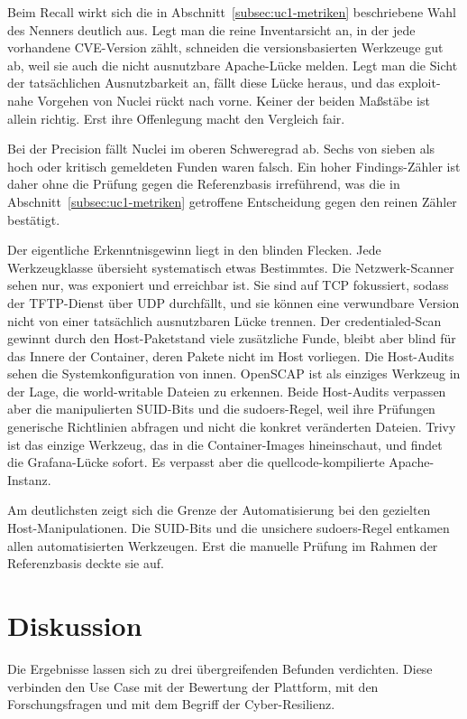 Beim Recall wirkt sich die in Abschnitt~\ref{subsec:uc1-metriken} beschriebene Wahl des Nenners
deutlich aus. Legt man die reine Inventarsicht an, in der jede vorhandene CVE-Version zählt, schneiden
die versionsbasierten Werkzeuge gut ab, weil sie auch die nicht ausnutzbare Apache-Lücke melden.
Legt man die Sicht der tatsächlichen Ausnutzbarkeit an, fällt diese Lücke heraus, und das exploit-nahe
Vorgehen von Nuclei rückt nach vorne. Keiner der beiden Maßstäbe ist allein richtig. Erst ihre
Offenlegung macht den Vergleich fair.

Bei der Precision fällt Nuclei im oberen Schweregrad ab. Sechs von sieben als hoch oder kritisch
gemeldeten Funden waren falsch. Ein hoher Findings-Zähler ist daher ohne die Prüfung gegen die
Referenzbasis irreführend, was die in Abschnitt~\ref{subsec:uc1-metriken} getroffene Entscheidung
gegen den reinen Zähler bestätigt.

Der eigentliche Erkenntnisgewinn liegt in den blinden Flecken. Jede Werkzeugklasse übersieht
systematisch etwas Bestimmtes. Die
Netzwerk-Scanner sehen nur, was exponiert und erreichbar ist. Sie sind auf TCP fokussiert, sodass der
TFTP-Dienst über UDP durchfällt, und sie können eine verwundbare Version nicht von einer tatsächlich
ausnutzbaren Lücke trennen. Der credentialed-Scan gewinnt durch den Host-Paketstand viele zusätzliche
Funde, bleibt aber blind für das Innere der Container, deren Pakete nicht im Host vorliegen. Die
Host-Audits sehen die Systemkonfiguration von innen. OpenSCAP ist als einziges Werkzeug in der Lage,
die world-writable Dateien zu erkennen. Beide Host-Audits verpassen aber die manipulierten SUID-Bits
und die sudoers-Regel, weil ihre Prüfungen generische Richtlinien abfragen und nicht die konkret
veränderten Dateien. Trivy ist das einzige Werkzeug, das in die Container-Images hineinschaut, und
findet die Grafana-Lücke sofort. Es verpasst aber die quellcode-kompilierte Apache-Instanz.

Am deutlichsten zeigt sich die Grenze der Automatisierung bei den gezielten Host-Manipulationen. Die
SUID-Bits und die unsichere sudoers-Regel entkamen allen automatisierten Werkzeugen. Erst die manuelle
Prüfung im Rahmen der Referenzbasis deckte sie auf.


\section{Diskussion}
\label{sec:uc1-diskussion}

Die Ergebnisse lassen sich zu drei übergreifenden Befunden verdichten. Diese verbinden den Use Case
mit der Bewertung der Plattform, mit den Forschungsfragen und mit dem Begriff der Cyber-Resilienz.

